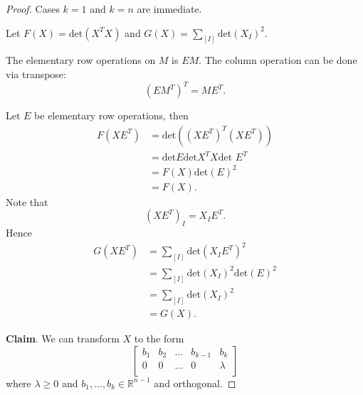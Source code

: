 \begin{proof}
	Cases $k = 1$ and $k=n$ are immediate.

	Let $F(X) = \text{det}(X^T X)$ and $G(X) = \sum_{[I]}\text{det}(X_I)^2$.

	The elementary row operations on $M$ is $EM$. The column operation can be done via transpose:
	\[
		(EM^T)^T = ME^T
	.\] 

	Let $E$ be elementary row operations, then
	\begin{align*}
		F(X E^T) &=  \text{det}\left( (X E^T) ^T (XE^T) \right)  \\
		&= \text{det}E \text{det}X^T X \text{det }E^T \\
		&= F(X) \text{det}\left(E \right) ^2\\
		&= F(X) 
	.\end{align*}
	Note that
	\[
		(XE^T)_I = X_I E^T
	.\] 
	Hence
	\begin{align*}
		G(X E^T) &= \sum_{[I]} \text{det}(X_I E^T)^2\\
			 &= \sum_{[I]}\text{det}(X_I)^2 \text{det}(E)^2 \\
			 &= \sum_{[I ]}\text{det}(X_I)^2 \\
			 &= G(X) 
	.\end{align*}

	\textbf{Claim}. We can transform $X$ to the form
	\[
	\begin{bmatrix}
		b_1 & b_2 & \ldots & b_{k-1} & b_k \\
		0 & 0 & \ldots & 0 & \lambda \\
	\end{bmatrix}
\]
where $\lambda\ge 0$ and $b_1, \ldots, b_k \in \mathbb{R}^{n-1}$ and orthogonal.

\end{proof}



